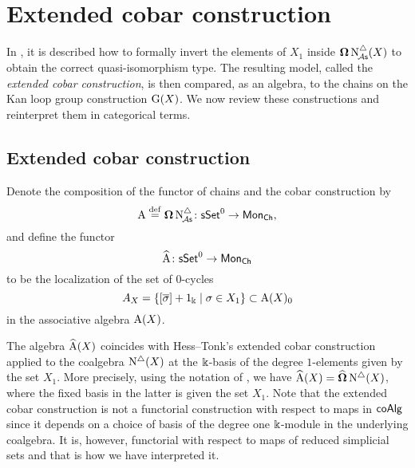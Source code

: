 
\section{Extended cobar construction}


In \cite{hess2010cobar}, it is described how to formally invert the elements of $X_1$ inside $\operatorname{\mathbf{\Omega}} \operatorname{N^{\triangle}_{\!{\mathcal{A}\mathsf{s}}}}(X)$ to obtain the correct quasi-isomorphism type.
The resulting model, called the \textit{extended cobar construction}, is then compared, as an algebra, to the chains on the Kan loop group construction $\operatorname{G}(X)$.
We now review these constructions and
reinterpret them in categorical terms.

\subsection{Extended cobar construction}

Denote the composition of the functor of chains and the cobar construction by
\[
\operatorname{A} \stackrel{\mathrm{def}}{=} \operatorname{\mathbf{\Omega}} \operatorname{N^{\triangle}_{\!{\mathcal{A}\mathsf{s}}}} \colon \mathsf{sSet}^0 \to \mathsf{Mon}_{\mathsf{Ch}},
\]
and define the functor
\[
\operatorname{\widehat{A}} \colon \mathsf{sSet}^0 \to \mathsf{Mon}_{\mathsf{Ch}}
\]
to be the localization of the set of $0$-cycles
\[
A_X = \{ [\overline{\sigma}]+1_\Bbbk \mid \sigma \in X_1 \} \subset \operatorname{A}(X)_0
\]
in the associative algebra $\operatorname{A}(X)$.

The algebra $\operatorname{\widehat{A}}(X)$ coincides with Hess--Tonk's extended cobar construction applied to the coalgebra $\operatorname{N^{\triangle}}(X)$ at the $\Bbbk$-basis of the degree $1$-elements given by the set $X_1$.
More precisely, using the notation of \cite{hess2010cobar}, we have $\operatorname{\widehat{A}}(X) = \widehat{\operatorname{\mathbf{\Omega}}} \operatorname{N^{\triangle}}(X)$, where the fixed basis in the latter is given the set $X_1$.
Note that the extended cobar construction is not a functorial construction with respect to maps in $\mathsf{coAlg}$ since it depends on a choice of basis of the degree one $\Bbbk$-module in the underlying coalgebra.
It is, however, functorial with respect to maps of reduced simplicial sets and that is how we have interpreted it.

